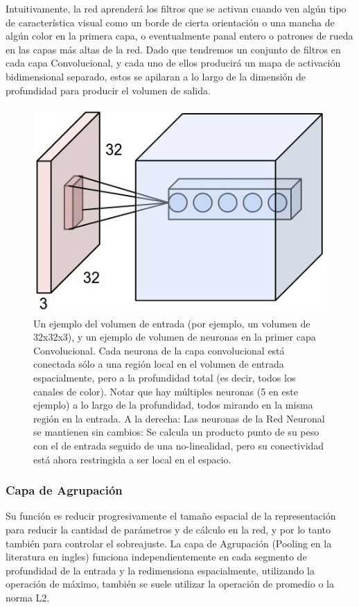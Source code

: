 \documentclass[a4paper,11pt,spanish]{book}
\begin{document}
	Intuitivamente, la red aprenderá los filtros que se activan cuando ven algún tipo de característica visual como un borde de cierta orientación o una mancha de algún color en la
	primera capa, o eventualmente panal entero o patrones de rueda en las capas más altas de la red. Dado que tendremos un conjunto de filtros en cada capa Convolucional,
	y cada uno de ellos producirá un mapa de activación bidimensional separado, estos se apilaran a lo largo de la dimensión de profundidad para producir el volumen de salida.

	\begin{figure}[H]
	  \begin{center}
	   \includegraphics[width=0.8\linewidth]{./img/stanford_conv_layer.jpeg}
	  \end{center}
	  \caption{Un ejemplo del volumen de entrada (por ejemplo, un volumen de 32x32x3), y un ejemplo de volumen de neuronas en la primer capa Convolucional.
	    Cada neurona de la capa convolucional está conectada sólo a una región local en el volumen de entrada espacialmente, pero a la profundidad total (es decir, todos
	    los canales de color). Notar que hay múltiples neuronas (5 en este ejemplo) a lo largo de la profundidad, todos mirando en la misma región en la entrada.
	    A la derecha: Las neuronas de la Red Neuronal se mantienen sin cambios: Se calcula un producto punto de su peso con el de entrada seguido de una no-linealidad,
	    pero su conectividad está ahora restringida a ser local en el espacio. \cite{Karpathy:Stanford}}
	  \label{fig:conv_layer}
	\end{figure}

      \subsubsection{Capa de Agrupación}
	Su función es reducir progresivamente el tamaño espacial de la representación para reducir la cantidad de parámetros y de cálculo en la red, y por lo tanto también para controlar
	el sobreajuste. La capa de Agrupación (Pooling en la literatura en ingles) funciona independientemente en cada segmento de profundidad de la entrada y la redimensiona espacialmente, utilizando la operación de máximo,
	también se suele utilizar la operación de promedio o la norma L2.
\end{document}
